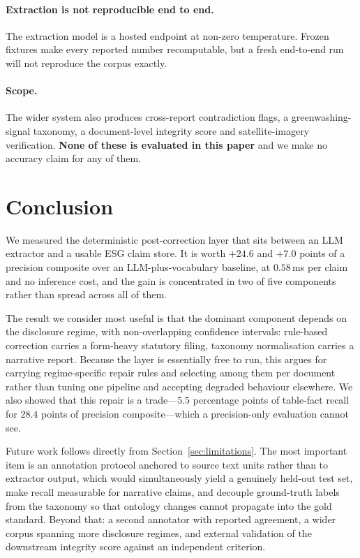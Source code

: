 \documentclass[3p,times]{elsarticle}
\begin{document}
\paragraph{Extraction is not reproducible end to end.} The extraction model is a
hosted endpoint at non-zero temperature. Frozen fixtures make every reported
number recomputable, but a fresh end-to-end run will not reproduce the corpus
exactly.

\paragraph{Scope.} The wider system also produces cross-report contradiction
flags, a greenwashing-signal taxonomy, a document-level integrity score and
satellite-imagery verification. \textbf{None of these is evaluated in this paper}
and we make no accuracy claim for any of them.

\section{Conclusion}

We measured the deterministic post-correction layer that sits between an LLM
extractor and a usable ESG claim store. It is worth $+24.6$ and $+7.0$ points of
a precision composite over an LLM-plus-vocabulary baseline, at $0.58$\,ms per
claim and no inference cost, and the gain is concentrated in two of five
components rather than spread across all of them.

The result we consider most useful is that the dominant component depends on the
disclosure regime, with non-overlapping confidence intervals: rule-based
correction carries a form-heavy statutory filing, taxonomy normalisation carries
a narrative report. Because the layer is essentially free to run, this argues for
carrying regime-specific repair rules and selecting among them per document
rather than tuning one pipeline and accepting degraded behaviour elsewhere. We
also showed that this repair is a trade---$5.5$ percentage points of table-fact
recall for $28.4$ points of precision composite---which a precision-only
evaluation cannot see.

Future work follows directly from Section~\ref{sec:limitations}. The most
important item is an annotation protocol anchored to source text units rather
than to extractor output, which would simultaneously yield a genuinely held-out
test set, make recall measurable for narrative claims, and decouple ground-truth
labels from the taxonomy so that ontology changes cannot propagate into the gold
standard. Beyond that: a second annotator with reported agreement, a wider corpus
spanning more disclosure regimes, and external validation of the downstream
integrity score against an independent criterion.




\end{document}
